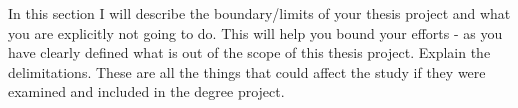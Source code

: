 In this section I will describe the boundary/limits of your thesis project and what you are explicitly not going to do. This will help you bound your efforts - as you have clearly defined what is out of the scope of this thesis project. Explain the delimitations. These are all the things that could affect the study if they were examined and included in the degree project.
